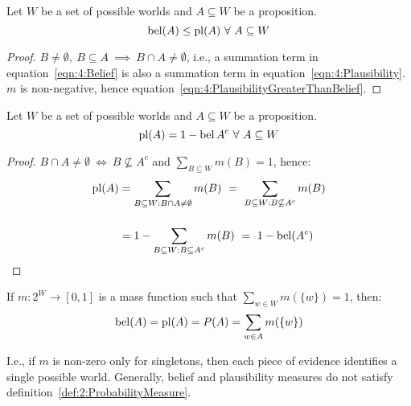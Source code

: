 \begin{thm}
  Let $W$ be a set of possible worlds and $A \subseteq W$ be a proposition.
  \begin{equation}
    \label{eqn:4:PlausibilityGreaterThanBelief}
    \operatorname*{bel}(A) \leq \operatorname*{pl}(A) \ \forall\ A \subseteq W
  \end{equation}
  \begin{proof}
    $B \neq \emptyset,\ B \subseteq A \ \implies \ B \cap A \neq \emptyset$,
    i.e., a summation term in equation~\ref{eqn:4:Belief} is also a summation
    term in equation~\ref{eqn:4:Plausibility}.
    $m$ is non-negative, hence equation~\ref{eqn:4:PlausibilityGreaterThanBelief}.
  \end{proof}
\end{thm}

\begin{thm}
  \label{thm:4:DualRelationship}
  Let $W$ be a set of possible worlds and $A \subseteq W$ be a proposition.
  \begin{equation}
    \label{eqn:4:DualRelationship}
    \operatorname*{pl}(A) = 1 - \operatorname*{bel}{A^{c}} \ \forall\ A \subseteq W
  \end{equation}
  \begin{proof}
    $B \cap A \neq \emptyset \ \iff\  B \not\subseteq A^{c}$ and
    $\sum_{B \subseteq W} m(B) = 1$, hence:
    \begin{align*}
      \operatorname*{pl}(A)
       & = \sum_{B \subseteq W : B \cap A \neq \emptyset} m(B)
      \ =\ \sum_{B \subseteq W : B \not\subseteq A^{c}} m(B)
      \\[3ex]
       & = 1 - \sum_{B \subseteq W : B \subseteq A^{c}} m(B)
      \ =\ 1 - \operatorname*{bel}(A^{c})
    \end{align*}
  \end{proof}
\end{thm}

\begin{thm}
  If $m : 2^W \to [0, 1]$ is a mass function such that
  $\sum_{w \in W} m(\{w\}) = 1$, then:
  \begin{equation}
    \operatorname*{bel}(A) = \operatorname*{pl}(A) = P(A) = \sum_{w \in A} m(\{w\})
  \end{equation}
\end{thm}

I.e., if $m$ is non-zero only for singletons, then each piece of evidence
identifies a single possible world.
Generally, belief and plausibility measures do not satisfy
definition~\ref{def:2:ProbabilityMeasure}.

